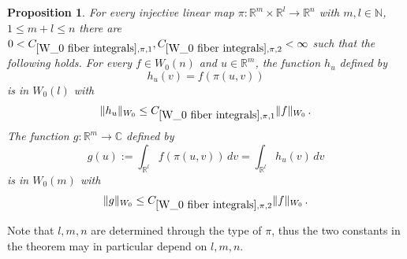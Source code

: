 \documentclass[12pt,reqno]{amsart}
\theoremstyle{plain}
\newtheorem{proposition}[theorem]{Proposition}
\numberwithin{equation}{section}
\theoremstyle{remark}
\newcommand{\uses}[1]{}
\newcommand{\usesdefs}[1]{}
\newcommand{\R}{{\mathbb R}}
\newcommand{\Rm}{{\mathbb R}^m}
\newcommand{\N}{{\mathbb N}}
\newcommand{\C}{{\mathbb C}}
\begin{document}
\begin{proposition}\label{W_0 fiber integrals}\uses{P:lp-embedding,W_0 radius independence,auto:local-supremum-measurability}\usesdefs{auto:Wiener-space-definition}
For every injective linear map $\pi:\R^{m}\times \R^{l}\to \R^n$ with $m,l\in\N$, $1\le m+l\le n$
there are $0<C_{\ref{W_0 fiber integrals},\pi,1},C_{\ref{W_0 fiber integrals},\pi,2}<\infty$ such that the following holds. For every $f\in W_0(n)$ and $u\in\R^m$, the function $h_u$ defined by
\begin{equation}\label{auto:Wiener-fiber-function}
    h_u(v)=f(\pi(u,v))
\end{equation}
is in $W_0(l)$ with
\begin{equation}\label{W_0 on fiber}
    \|h_u\|_{W_0}\le C_{\ref{W_0 fiber integrals},\pi,1} \|f\|_{W_0}\, .
\end{equation}
The function $g:\Rm\to \C$ defined by
\begin{equation}\label{auto:Wiener-fiber-integral} g(u) := \int_{\R^l} f(\pi(u,v)) \,dv= \int_{\R^l} h_u(v) \,dv \end{equation}
is in $W_0(m)$ with
\begin{equation}\label{W_0 across fibers}
    \|g\|_{W_0}\le C_{\ref{W_0 fiber integrals},\pi,2}  \|f\|_{W_0}\, .
\end{equation}
\end{proposition}
 Note that $l,m,n$ are determined through the type of $\pi$, thus the two constants in the theorem
 may in particular depend on $l,m,n$.
\end{document}
